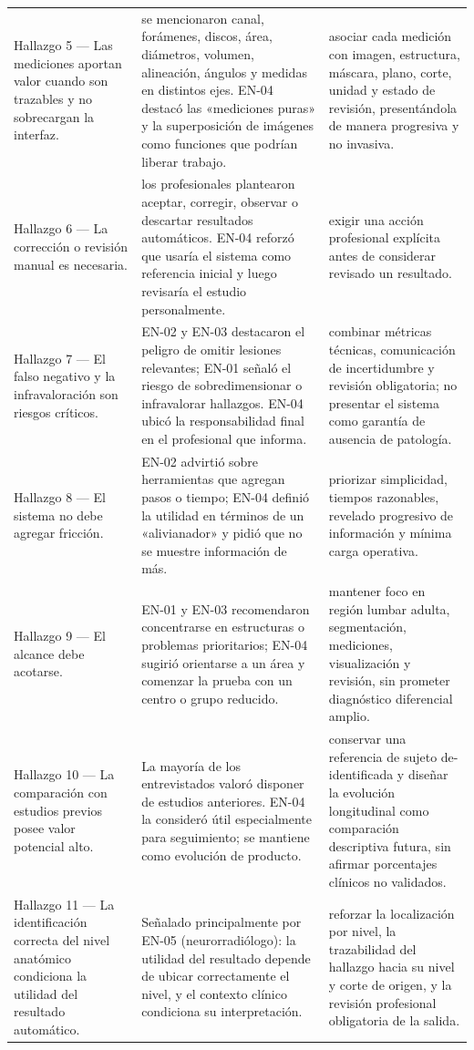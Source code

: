 {\begin{longtable}{p{} p{} p{}}
Hallazgo 5 — Las mediciones aportan valor cuando son trazables y no sobrecargan la interfaz. & se mencionaron canal, forámenes, discos, área, diámetros, volumen, alineación, ángulos y medidas en distintos ejes. EN-04 destacó las «mediciones puras» y la superposición de imágenes como funciones que podrían liberar trabajo. & asociar cada medición con imagen, estructura, máscara, plano, corte, unidad y estado de revisión, presentándola de manera progresiva y no invasiva. \\
Hallazgo 6 — La corrección o revisión manual es necesaria. & los profesionales plantearon aceptar, corregir, observar o descartar resultados automáticos. EN-04 reforzó que usaría el sistema como referencia inicial y luego revisaría el estudio personalmente. & exigir una acción profesional explícita antes de considerar revisado un resultado. \\
Hallazgo 7 — El falso negativo y la infravaloración son riesgos críticos. & EN-02 y EN-03 destacaron el peligro de omitir lesiones relevantes; EN-01 señaló el riesgo de sobredimensionar o infravalorar hallazgos. EN-04 ubicó la responsabilidad final en el profesional que informa. & combinar métricas técnicas, comunicación de incertidumbre y revisión obligatoria; no presentar el sistema como garantía de ausencia de patología. \\
Hallazgo 8 — El sistema no debe agregar fricción. & EN-02 advirtió sobre herramientas que agregan pasos o tiempo; EN-04 definió la utilidad en términos de un «alivianador» y pidió que no se muestre información de más. & priorizar simplicidad, tiempos razonables, revelado progresivo de información y mínima carga operativa. \\
Hallazgo 9 — El alcance debe acotarse. & EN-01 y EN-03 recomendaron concentrarse en estructuras o problemas prioritarios; EN-04 sugirió orientarse a un área y comenzar la prueba con un centro o grupo reducido. & mantener foco en región lumbar adulta, segmentación, mediciones, visualización y revisión, sin prometer diagnóstico diferencial amplio. \\
Hallazgo 10 — La comparación con estudios previos posee valor potencial alto. & La mayoría de los entrevistados valoró disponer de estudios anteriores. EN-04 la consideró útil especialmente para seguimiento; se mantiene como evolución de producto. & conservar una referencia de sujeto de-identificada y diseñar la evolución longitudinal como comparación descriptiva futura, sin afirmar porcentajes clínicos no validados. \\
Hallazgo 11 — La identificación correcta del nivel anatómico condiciona la utilidad del resultado automático. & Señalado principalmente por EN-05 (neurorradiólogo): la utilidad del resultado depende de ubicar correctamente el nivel, y el contexto clínico condiciona su interpretación. & reforzar la localización por nivel, la trazabilidad del hallazgo hacia su nivel y corte de origen, y la revisión profesional obligatoria de la salida. \\
\hline
\end{longtable}
}

